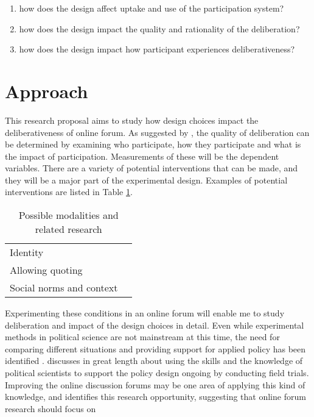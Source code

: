 \documentclass[journal,a4paper]{IEEEtran}
\begin{document}
\begin{enumerate}
\item how does the design affect uptake and use of the participation system?
\item how does the design impact the quality and rationality of the deliberation?
\item how does the design impact how participant experiences deliberativeness?
\end{enumerate}

\section{Approach}
This research proposal aims to study how design choices impact the deliberativeness of online forum. As suggested by , the quality of deliberation can be determined by examining who participate, how they participate and what is the impact of participation. Measurements of these will be the dependent variables. There are a variety of potential interventions that can be made, and they will be a major part of the experimental design. Examples of potential interventions are listed in Table \ref{tab:modalities}.

\begin{table}
\caption{Possible modalities and related research}
\begin{tabular}{ll}
Identity & \cite{danet98,donath99}  \\ 
Allowing quoting & \cite{eklundh94} \\ 
Social norms and context & \cite{sukumaran11,underhill03} \\
\end{tabular} 
\label{tab:modalities}
\end{table}

Experimenting these conditions in an online forum will enable me to study deliberation and impact of the design choices in detail. Even while experimental methods in political science are not mainstream at this time, the need for comparing different situations and providing support for applied policy has been identified \cite{green03}.  discusses in great length about using the skills and the knowledge of political scientists to support the policy design ongoing by conducting field trials. Improving the online discussion forums may be one area of applying this kind of knowledge, and  identifies this research opportunity, suggesting that online forum research should focus on
\end{document}
